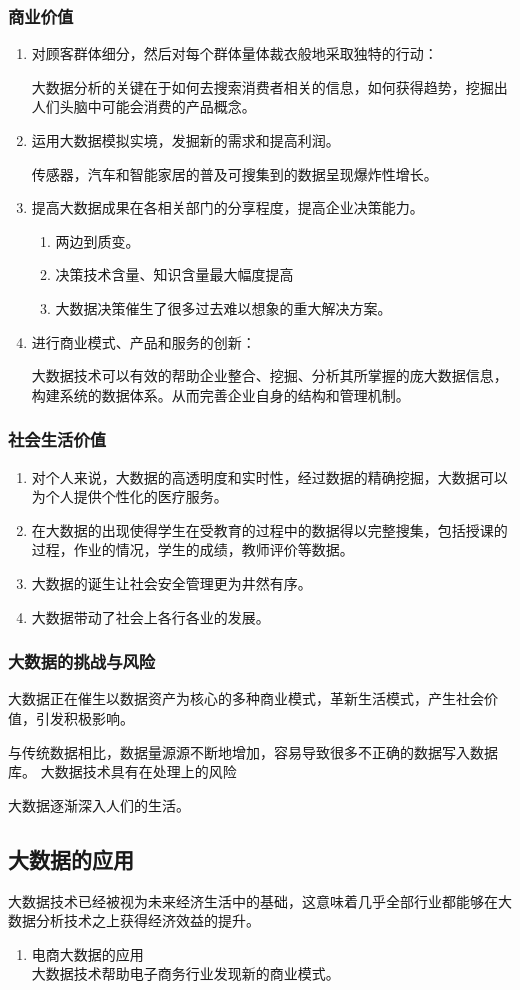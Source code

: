 \documentclass{article}
\begin{document}
\subsubsection{商业价值}
\begin{enumerate}
    \item 对顾客群体细分，然后对每个群体量体裁衣般地采取独特的行动： \par
          \qquad 大数据分析的关键在于如何去搜索消费者相关的信息，如何获得趋势，挖掘出人们头脑中可能会消费的产品概念。
    \item 运用大数据模拟实境，发掘新的需求和提高利润。\par
          \qquad 传感器，汽车和智能家居的普及可搜集到的数据呈现爆炸性增长。
    \item 提高大数据成果在各相关部门的分享程度，提高企业决策能力。
          \begin{enumerate}
              \item 两边到质变。
              \item 决策技术含量、知识含量最大幅度提高
              \item 大数据决策催生了很多过去难以想象的重大解决方案。
          \end{enumerate}
    \item 进行商业模式、产品和服务的创新： \par
          \qquad 大数据技术可以有效的帮助企业整合、挖掘、分析其所掌握的庞大数据信息，构建系统的数据体系。从而完善企业自身的结构和管理机制。
\end{enumerate}
\subsubsection{社会生活价值}
\begin{enumerate}
    \item 对个人来说，大数据的高透明度和实时性，经过数据的精确挖掘，大数据可以为个人提供个性化的医疗服务。
    \item 在大数据的出现使得学生在受教育的过程中的数据得以完整搜集，包括授课的过程，作业的情况，学生的成绩，教师评价等数据。
    \item 大数据的诞生让社会安全管理更为井然有序。
    \item 大数据带动了社会上各行各业的发展。
\end{enumerate}
\subsubsection{大数据的挑战与风险}
大数据正在催生以数据资产为核心的多种商业模式，革新生活模式，产生社会价值，引发积极影响。 \par
与传统数据相比，数据量源源不断地增加，容易导致很多不正确的数据写入数据库。 大数据技术具有在处理上的风险\par
大数据逐渐深入人们的生活。
\subsection{大数据的应用}
大数据技术已经被视为未来经济生活中的基础，这意味着几乎全部行业都能够在大数据分析技术之上获得经济效益的提升。
\begin{enumerate}
    \item 电商大数据的应用 \\
          \qquad 大数据技术帮助电子商务行业发现新的商业模式。
\end{enumerate}
\end{document}
